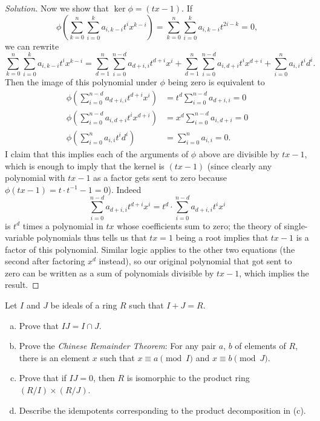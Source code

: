 \documentclass[10pt]{scrartcl}
\providecommand{\ii}{\item}
\providecommand{\inv}{^{-1}}
\newenvironment{soln}{\begin{proof}[Solution]}{\end{proof}}
\begin{document}
\begin{soln}
	Now we show that $\ker\phi = (tx-1)$. If
	\[\phi\left(\sum_{k=0}^n \sum_{i=0}^k a_{i,k-i}t^ix^{k-i}\right)
	= \sum_{k=0}^n \sum_{i=0}^k a_{i,k-i}t^{2i-k} = 0,\]
	we can rewrite
	\[\sum_{k=0}^n \sum_{i=0}^k a_{i,k-i}t^ix^{k-i}
	= \sum_{d=1}^n \sum_{i = 0}^{ n-d} a_{d+i,i} t^{d+i}x^i
	+ \sum_{d=1}^n \sum_{i = 0}^{n-d} a_{i,d+i} t^{i}x^{d+i}
	+ \sum_{i=0}^{n} a_{i,i} t^id^i.\]
	Then the image of this polynomial under $\phi$ being zero
	is equivalent to
	\begin{align*}
		\phi\left(\sum_{i = 0}^{ n-d} a_{d+i,i} t^{d+i}x^i\right)
		&= t^d \sum_{i = 0}^{ n-d} a_{d+i,i} = 0\\
		\phi\left(\sum_{i = 0}^{n-d} a_{i,d+i} t^{i}x^{d+i}\right)
		&= x^d \sum_{i = 0}^{ n-d} a_{i,d+i} = 0\\
		\phi\left(\sum_{i=0}^{n} a_{i,i} t^id^i\right)
		&= \sum_{i=0}^{n} a_{i,i} = 0.
	\end{align*}
	I claim that this implies each of the arguments of $\phi$ above
	are divisible by $tx-1$, which is enough to imply that
	the kernel is $(tx-1)$ (since clearly any polynomial with $tx-1$
	as a factor gets sent to zero because $\phi(tx-1) = t\cdot t\inv-1 = 0$).
	Indeed
	\[\sum_{i = 0}^{ n-d} a_{d+i,i} t^{d+i}x^i
	= t^d\cdot \sum_{i = 0}^{ n-d} a_{d+i,i} t^{i}x^i\]
	is $t^d$ times a polynomial in $tx$ whose coefficients sum to zero;
	the theory of single-variable polynomials thus tells us that
	$tx = 1$ being a root implies that $tx - 1$ is a factor of this polynomial.
	Similar logic applies to the other two equations
	(the second after factoring $x^d$ instead),
	so our original polynomial that got sent to zero
	can be written as a sum of polynomials divisible by $tx-1$,
	which implies the result.
\end{soln}

\begin{problem*}[6.8]
	Let $I$ and $J$ be ideals of a ring $R$ such that $I+J = R$.
	\begin{enumerate}[(a)]
		\ii Prove that $IJ = I\cap J$.
		\ii Prove the \emph{Chinese Remainder Theorem}:
		For any pair $a$, $b$ of elements of $R$, there is an element $x$
		such that $x\equiv a\pmod I$ and $x\equiv b\pmod J$.
		\ii Prove that if $IJ = 0$, then $R$ is isomorphic to
		the product ring $(R/I)\times (R/J)$.
		\ii Describe the idempotents corresponding to the
		product decomposition in (c).
	\end{enumerate}
\end{problem*}
\end{document}
